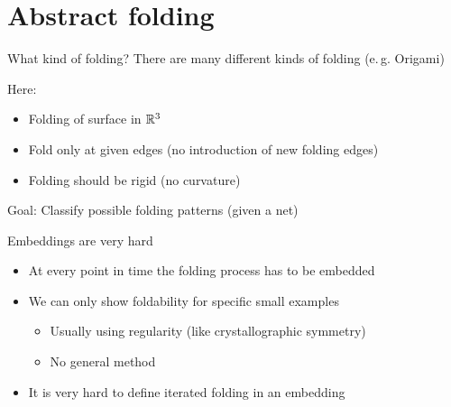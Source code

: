 \section{Abstract folding}
\frame{\tableofcontents[currentsection]}

\begin{frame}{What kind of folding?}
    \pause
    There are many different kinds of folding (e.\,g. Origami)

    \pause
    Here:
    \begin{itemize}
        \pause
        \item Folding of surface in $\mathbb{R}^3$
        \pause
        \item Fold only at given edges (no introduction of new folding edges)
        \pause
        \item Folding should be rigid (no curvature)
    \end{itemize}

    \pause
    Goal: Classify possible folding patterns (given a net)

    \pause
    \begin{center}
    \end{center}

\end{frame}


\begin{frame}{Embeddings are very hard}
    \begin{itemize}
        \item<2-> At every point in time the folding process has to be embedded
        \item<3-> We can only show foldability for specific small examples
            \begin{itemize}
                \item<4-> Usually using regularity (like crystallographic symmetry)
                \item<5-> No general method
            \end{itemize}
        \item<6-> It is very hard to define iterated folding in an embedding
    \end{itemize}

    \begin{center}
    \end{center}

\end{frame}


